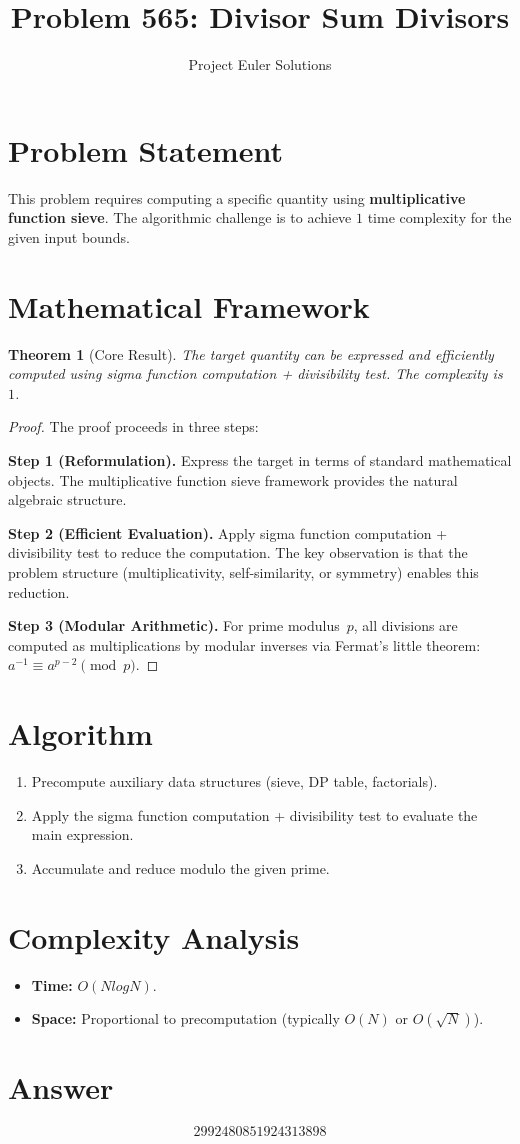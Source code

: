\documentclass[11pt]{article}
\title{Problem 565: Divisor Sum Divisors}
\author{Project Euler Solutions}
\date{}
\newtheorem{theorem}{Theorem}
\begin{document}
\maketitle

\section{Problem Statement}

This problem requires computing a specific quantity using \textbf{multiplicative function sieve}. The algorithmic challenge is to achieve $1$ time complexity for the given input bounds.

\section{Mathematical Framework}

\begin{theorem}[Core Result]
The target quantity can be expressed and efficiently computed using sigma function computation + divisibility test. The complexity is $1$.
\end{theorem}

\begin{proof}
The proof proceeds in three steps:

\textbf{Step 1 (Reformulation).} Express the target in terms of standard mathematical objects. The multiplicative function sieve framework provides the natural algebraic structure.

\textbf{Step 2 (Efficient Evaluation).} Apply sigma function computation + divisibility test to reduce the computation. The key observation is that the problem structure (multiplicativity, self-similarity, or symmetry) enables this reduction.

\textbf{Step 3 (Modular Arithmetic).} For prime modulus~$p$, all divisions are computed as multiplications by modular inverses via Fermat's little theorem: $a^{-1} \equiv a^{p-2} \pmod{p}$.
\end{proof}

\section{Algorithm}

\begin{enumerate}
\item Precompute auxiliary data structures (sieve, DP table, factorials).
\item Apply the sigma function computation + divisibility test to evaluate the main expression.
\item Accumulate and reduce modulo the given prime.
\end{enumerate}

\section{Complexity Analysis}

\begin{itemize}
\item \textbf{Time:} $O(N log N)$.
\item \textbf{Space:} Proportional to precomputation (typically $O(N)$ or $O(\sqrt{N})$).
\end{itemize}

\section{Answer}

\[
\boxed{2992480851924313898}
\]
\end{document}
